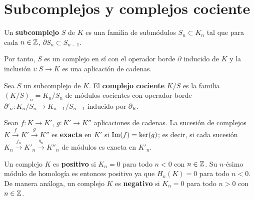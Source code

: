 \section{Subcomplejos y complejos cociente}

\begin{definicion}
	Un \textbf{subcomplejo} $S$ de $K$ es una familia de submódulos $S_n \subset K_n$ tal que para cada $n \in \mathbb{Z}$, $\partial S_n \subset S_{n-1}$.
\end{definicion}

Por tanto, $S$ es un complejo en sí con el operador borde $\partial$ inducido de $K$ y la inclusión $i: S \rightarrow K$ es una aplicación de cadenas.

\begin{definicion}
	Sea $S$ un subcomplejo de $K$. El \textbf{complejo cociente} $K/S$ es la familia $(K/S)_n = K_n/S_n$ de módulos cocientes con operador borde $\partial'_n: K_n/S_n \rightarrow K_{n-1}/S_{n-1}$ inducido por $\partial_K$.
\end{definicion}

%

\begin{definicion}
Sean \( f: K \rightarrow K' \), \( g: K' \rightarrow K'' \) aplicaciones de cadenas. La sucesión de complejos \( K \xrightarrow{f} K' \xrightarrow{g} K'' \) es \textbf{exacta} en \( K' \) si \( \operatorname{Im}(f) = \ker(g) \); es decir, si cada sucesión \( K_n \xrightarrow{f_n} K'_n \xrightarrow{g_n} K''_n \) de módulos es exacta en \( K'_n \).
\end{definicion}


\begin{definicion}
Un complejo \( K \) es \textbf{positivo} si \( K_n = 0 \) para todo \( n < 0 \) con $n \in \mathbb{Z}$. Su $n$-ésimo módulo de homología es entonces positivo  ya que \( H_n(K) = 0 \) para todo \( n < 0 \). De manera análoga, un complejo \( K \) es \textbf{negativo} si \( K_n = 0 \) para todo \( n > 0 \) con $n \in \mathbb{Z}$.
\end{definicion}

